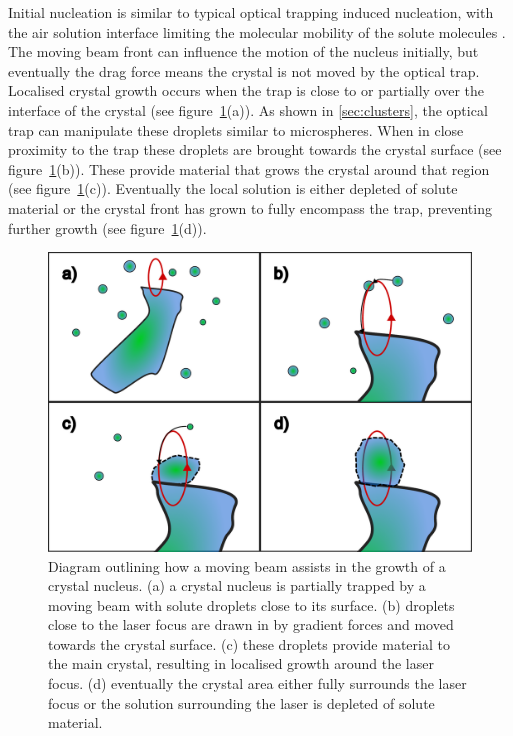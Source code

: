 Initial nucleation is similar to typical optical trapping induced nucleation,
with the air solution interface limiting the molecular mobility of the solute
molecules \cite{Liao2022, Sugiyama2009, Gowayed2021}. The moving beam front 
can influence the motion of the nucleus initially, but eventually the drag 
force means the crystal is not moved by the optical trap. Localised crystal
growth occurs when the trap is close to or partially over the interface of 
the crystal (see figure~\ref{fig:local_nucleation}(a)). As shown in \ref{sec:clusters}, 
the optical trap can manipulate these droplets similar 
to microspheres. When in close proximity to the trap these droplets are 
brought towards the crystal surface (see figure~\ref{fig:local_nucleation}(b)). 
These provide material that grows the crystal around that region (see figure~\ref{fig:local_nucleation}(c)). Eventually the local solution is either 
depleted of solute material or the crystal front has grown to fully encompass 
the trap, preventing further growth (see figure~\ref{fig:local_nucleation}(d)). 
\begin{figure}[h!]
	\centering
	\includegraphics[width=0.8\linewidth]{galvano_diagram.pdf}
	\caption{Diagram outlining how a moving beam assists in the growth of a crystal
		nucleus. (a) a crystal nucleus is partially trapped by a moving beam with 
		solute droplets close to its surface. (b) droplets close to the laser
		focus are drawn in by gradient forces and moved towards the crystal surface.
		(c) these droplets provide material to the main crystal, resulting in
		localised growth around the laser focus. (d) eventually the crystal area 
		either fully surrounds the laser focus or the solution surrounding the laser
		is depleted of solute material.}
	\label{fig:local_nucleation}
\end{figure}

